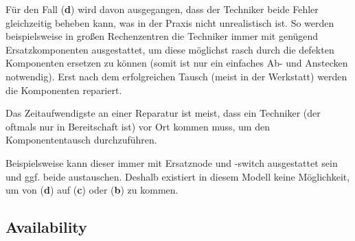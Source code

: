 \documentclass[
            a4paper
            ]{scrartcl}%
\begin{document}
Für den Fall (\textbf{d}) wird davon ausgegangen, dass der Techniker beide Fehler 
gleichzeitig beheben kann, was in der Praxis nicht unrealistisch ist.
So werden beispielsweise in großen Rechenzentren die Techniker immer mit genügend
Ersatzkomponenten ausgestattet, um diese möglichst rasch durch die defekten Komponenten
ersetzen zu können (somit ist nur ein einfaches Ab- und Anstecken notwendig).
Erst nach dem erfolgreichen Tausch (meist in der Werkstatt) werden die
Komponenten repariert. 

Das Zeitaufwendigste an einer Reparatur ist meist, dass ein
Techniker (der oftmals nur in Bereitschaft ist) vor Ort kommen muss, um den
Komponententausch durchzuführen.

Beispielsweise kann dieser immer mit Ersatznode und -switch ausgestattet sein
und ggf. beide austauschen. 
Deshalb existiert in diesem Modell keine Möglichkeit, um von (\textbf{d}) auf
(\textbf{c}) oder (\textbf{b}) zu kommen.

\subsection{Availability}\label{sec:sol_avail}
\end{document}
